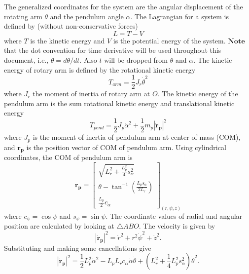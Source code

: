 \documentclass[superscriptaddress,floatfix,reprint,amssymb, amsmath,aps, pre]{revtex4-1}
\begin{document}
{{        The generalized coordinates for the system are the angular displacement of the rotating arm \(\theta\) and the pendulum angle \(\alpha\). The Lagrangian for a system is defined by (without non-conservative forces)
        \begin{equation}
            L = T - V
        \end{equation}
        where \(T\) is the kinetic energy and \(V\) is the potential energy of the system. \(\textbf{Note}\) that the dot convention for time derivative will be used throughout this document, i.e., \(\dot \theta = d\theta/d t\). Also \(t\) will be dropped from \(\theta\) and \(\alpha\). The kinetic energy of rotary arm is defined by the rotational kinetic energy 
        \begin{equation}
            T_{arm} = \frac{1}{2} J_r \dot \theta^2
        \end{equation}
        where \(J_r\) the moment of inertia of rotary arm at \(O\). The kinetic energy of the pendulum arm is the sum rotational kinetic energy and translational kinetic energy 
        \begin{equation}
            T_{pend} = \frac{1}{2} J_p \dot \alpha^2 + \frac{1}{2} m_p |\mathbf{\dot r_p}|^2 
        \end{equation}
        where \(J_p\) is the moment of inertia of pendulum arm at center of mass (COM), and \(\mathbf{r_p}\) is the position vector of COM of pendulum arm. Using cylindrical coordinates, the COM of pendulum arm is 
        \begin{equation}
            \mathbf{r_p} = \begin{bmatrix}
                \sqrt{L_r^2 + \frac{L_p^2}{4} s_\alpha^2} \\
                \theta - \tan^{-1}\left(\frac{L_p s_\alpha}{2 L_r}\right) \\
                \frac{L_p}{2} c_\alpha
            \end{bmatrix}_{(r,\psi,z)}
        \end{equation}
        where \(c_\psi = \cos \psi\) and \(s_\psi = \sin \psi\). The coordinate values of radial and angular position are calculated by looking at \(\triangle ABO\). The velocity is given by
        \begin{equation}
            |\mathbf{\dot r_p}|^2 = \dot r^2 + r^2 \dot \psi^2 + \dot z^2.
        \end{equation}
        Substituting and making some cancellations give
        \begin{equation}
            |\mathbf{\dot r_p}|^2 =\frac{1}{2} L_p^2 \dot \alpha^2 - L_p L_r c_\alpha \dot \alpha \dot \theta + \left(L_r^2 + \frac{1}{4} L_p^2 s_\alpha^2 \right) \dot \theta^2.

\end{equation}}}
\end{document}
